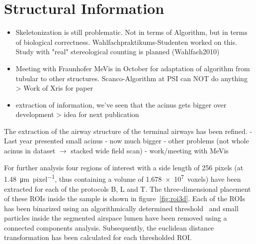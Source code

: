 \documentclass[a4paper,twoside,english,DIV=calc]{scrartcl}
\begin{document}
\section{Structural Information}
\begin{itemize}
\item Skeletonization is still problematic. Not in terms of Algorithm, but in terms of biological correctness. Wahlfachpraktikums-Studenten worked on this. Study with "real" stereological counting is planned (Wahlfach2010)
\item Meeting with Fraunhofer MeVis in October for adaptation of algorithm from tubular to other structures. Scanco-Algorithm at PSI can NOT do anything > Work of Xris for paper
\item extraction of information, we've seen that the acinus gets bigger over development > idea for next publication
\end{itemize}

The extraction of the airway structure of the terminal airways has been refined. - Last year presented small acinus - now much bigger - other problems (not whole acinus in dataset $\rightarrow$ stacked wide field scan) - work/meeting with MeVis

For further analysis four regions of interest with a side length of 256 pixels (at \SI{1.48}{\micro\meter\per pixel}, thus containing a volume of \SI{1.678e7}{voxels}) have been extracted for each of the protocols B, L and T. The three-dimensional placement of these ROIs inside the sample is shown in figure~\ref{fig:roi3d}. Each of the ROIs has been binarized using an algorithmically determined threshold~\cite{Otsu1979} and small particles inside the segmented airspace lumen have been removed using a connected components analysis. Subsequently, the euclidean distance transformation has been calculated for each thresholded ROI.
\end{document}
